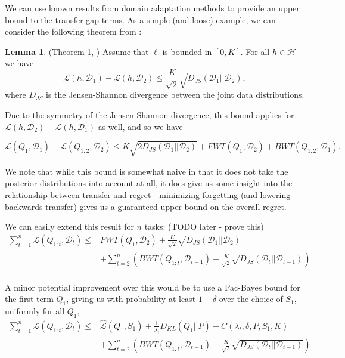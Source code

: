 \documentclass[letterpaper]{article}
\theoremstyle{definition}
\newtheorem{lemma}{Lemma}[section]
\begin{document}
We can use known results from domain adaptation methods to provide an upper bound to the transfer gap terms. As a simple (and loose) example, we can consider the following theorem from \citet{shui2020beyond}:

\begin{lemma} (Theorem 1, \citep{shui2020beyond})
	Assume that $\ell$ is bounded in $[0, K]$. For all $h\in \mathcal{H}$ we have
	$$\mathcal{L}(h, \mathcal{D}_1)-\mathcal{L}(h, \mathcal{D}_2)\leq \frac{K}{\sqrt{2}}\sqrt{D_{JS}(\mathcal{D}_1||\mathcal{D}_2)},$$ 
	where $D_{JS}$ is the Jensen-Shannon divergence between the joint data distributions.
\end{lemma}

Due to the symmetry of the Jensen-Shannon divergence, this bound applies for $\mathcal{L}(h, \mathcal{D}_2)-\mathcal{L}(h, \mathcal{D}_1)$ as well, and so we have

\begin{equation}
\mathcal{L}(Q_1, \mathcal{D}_1)+\mathcal{L}(Q_{1:2}, \mathcal{D}_2) \leq 
K\sqrt{2 D_{JS}(\mathcal{D}_1||\mathcal{D}_2)}+FWT(Q_1, \mathcal{D}_2)+ BWT(Q_{1:2}, \mathcal{D}_1).
\end{equation}

We note that while this bound is somewhat naive in that it does not take the posterior distributions into account at all, it does give us some insight into the relationship between transfer and regret - minimizing forgetting (and lowering backwards transfer) gives us a guaranteed upper bound on the overall regret. 

We can easily extend this result for $n$ tasks: (TODO later - prove this) %
\begin{equation}
\begin{split}
\sum_{t=1}^{n}\mathcal{L}(Q_{1:t}, \mathcal{D}_t) \leq &  FWT(Q_1, \mathcal{D}_2) + \frac{K}{\sqrt{2}}\sqrt{D_{JS}(\mathcal{D}_{1}||\mathcal{D}_{2})} \\ &+ \sum_{t=2}^{n}\left ( BWT(Q_{1:t}, \mathcal{D}_{t-1})+ \frac{K}{\sqrt{2}}\sqrt{D_{JS}(\mathcal{D}_{t}||\mathcal{D}_{t-1})}\right ) \\&
\end{split}
\end{equation}

A minor potential improvement over this would be to use a Pac-Bayes bound for the first term $Q_1$, giving us with probability at least $1-\delta$ over the choice of $S_1$, uniformly for all $Q_1$,
\begin{equation}
\begin{split}
\sum_{t=1}^{n}\mathcal{L}(Q_{1:t}, \mathcal{D}_t) \leq &  \hat{\mathcal{L}}(Q_1, S_1)+\frac{1}{\lambda_t}D_{KL}(Q_1||P)+C(\lambda_t,\delta,P,S_1, K) \\ &+ \sum_{t=2}^{n}\left ( BWT(Q_{1:t}, \mathcal{D}_{t-1})+ \frac{K}{\sqrt{2}}\sqrt{D_{JS}(\mathcal{D}_{t}||\mathcal{D}_{t-1})}\right ) \\&
\end{split}
\end{equation}
\end{document}
